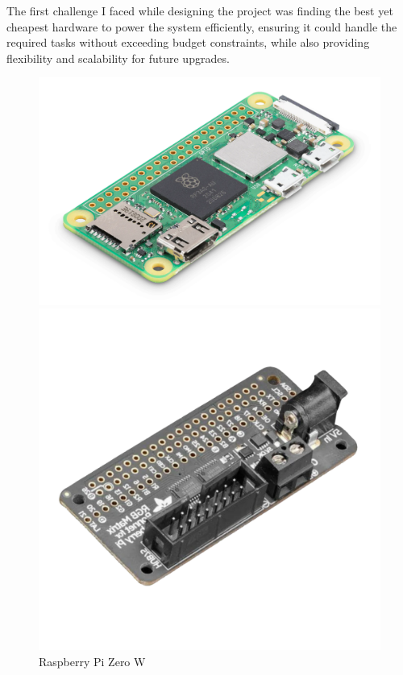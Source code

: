 The first challenge I faced while designing the project was finding the best yet cheapest hardware to power the system efficiently, ensuring it could handle the required tasks without exceeding budget constraints, while also providing flexibility and scalability for future upgrades.

\begin{figure}[h]
    \centering
    \begin{minipage}[b]{0.32\textwidth}
        \centering
        \includegraphics[width=\textwidth]{tesi/img/hardware_components/rpi.png}
        \caption*{Raspberry Pi Zero W}
    \end{minipage}
    \begin{minipage}[b]{0.32\textwidth}
        \centering
        \includegraphics[width=\textwidth]{tesi/img/hardware_components/bonnet.png}

\end{minipage}
\end{figure}
